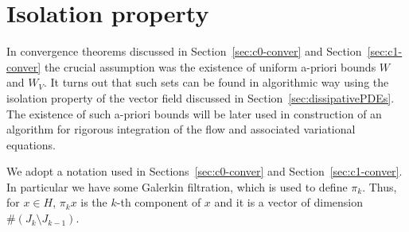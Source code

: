 \section{Isolation property}
\label{sec:isolation}

In convergence theorems discussed in Section~\ref{sec:c0-conver} and Section~\ref{sec:c1-conver} the crucial assumption was the existence of uniform a-priori bounds $W$ and $W_V$. It turns out that such sets can be found in algorithmic way using the isolation property of the vector field discussed in Section~\ref{sec:dissipativePDEs}. The existence of such a-priori bounds will be later used in construction of an algorithm for rigorous integration of the flow and associated variational equations.


We adopt a notation used in Sections~\ref{sec:c0-conver} and Section~\ref{sec:c1-conver}. In particular we have some Galerkin filtration, which is used to define $\pi_k$. Thus, for $x \in H$,
$\pi_k x$ is the $k$-th component of $x$ and it is a vector of dimension $\# (J_k \setminus J_{k-1})$. 



